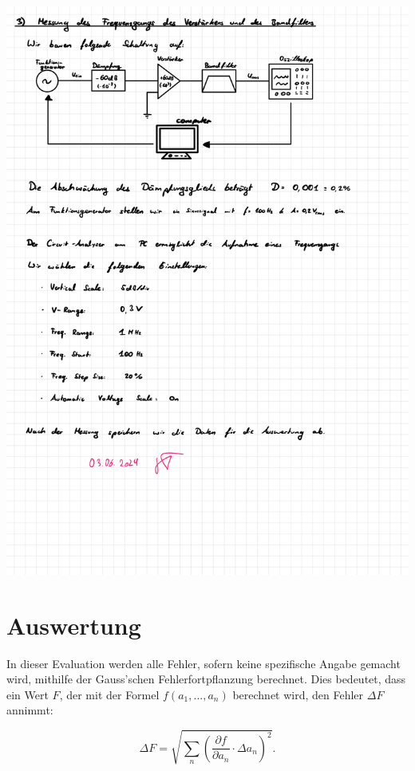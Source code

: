 \documentclass{article}
\begin{document}
\includegraphics[width=\textwidth]{graphics/mess3.jpg}
\newpage

\addtocounter{table}{1}

\clearpage
\newpage
\section{Auswertung}

In dieser Evaluation werden alle Fehler, sofern keine spezifische Angabe gemacht wird, mithilfe der Gauss'schen Fehlerfortpflanzung berechnet. Dies bedeutet, dass ein Wert $F$, der mit der Formel $f(a_1, ..., a_n)$ berechnet wird, den Fehler $\Delta F$ annimmt:

\begin{equation}
    \Delta F = \sqrt{\sum_n \left( \frac{\partial f}{\partial a_n} \cdot \Delta a_n \right)^2}.
\end{equation}
\end{document}
